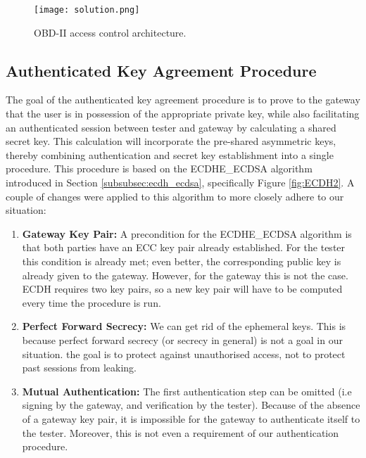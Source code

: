 \begin{figure}[h]
	\centering
	\texttt{[image: solution.png]}
	\caption{OBD-II access control architecture.}
	\label{fig:solution}
\end{figure}


\subsection{Authenticated Key Agreement Procedure}
\label{subsec:authenticated_key_agreement_procedure}

The goal of the authenticated key agreement procedure is to prove to the gateway that the user is in possession of the appropriate private key, while also facilitating an authenticated session between tester and gateway by calculating a shared secret key. This calculation will incorporate the pre-shared asymmetric keys, thereby combining authentication and secret key establishment into a single procedure. This procedure is based on the ECDHE\_ECDSA algorithm introduced in Section \ref{subsubsec:ecdh_ecdsa}, specifically Figure \ref{fig:ECDH2}. A couple of changes were applied to this algorithm to more closely adhere to our situation:
\begin{enumerate}
	\item \textbf{Gateway Key Pair:} A precondition for the ECDHE\_ECDSA algorithm is that both parties have an ECC key pair already established. For the tester this condition is already met; even better, the corresponding public key is already given to the gateway. However, for the gateway this is not the case. ECDH requires two key pairs, so a new key pair will have to be computed every time the procedure is run.
	
	\item \textbf{Perfect Forward Secrecy:} We can get rid of the ephemeral keys. This is because perfect forward secrecy (or secrecy in general) is not a goal in our situation. the goal is to protect against unauthorised access, not to protect past sessions from leaking. 
	
	\item \textbf{Mutual Authentication:} The first authentication step can be omitted (i.e signing by the gateway, and verification by the tester). Because of the absence of a gateway key pair, it is impossible for the gateway to authenticate itself to the tester. Moreover, this is not even a requirement of our authentication procedure.
\end{enumerate}
